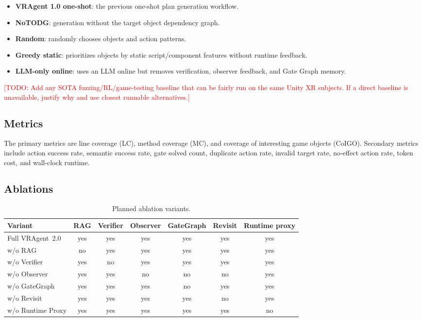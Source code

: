 \documentclass[10pt,conference]{IEEEtran}
\newcommand{\todo}[1]{\textcolor{red}{[TODO: #1]}}
\newcommand{\tool}{VRAgent~2.0}
\begin{document}
\begin{itemize}[leftmargin=*]
  \item \textbf{VRAgent 1.0 one-shot}: the previous one-shot plan generation
  workflow.
  \item \textbf{NoTODG}: generation without the target object dependency graph.
  \item \textbf{Random}: randomly chooses objects and action patterns.
  \item \textbf{Greedy static}: prioritizes objects by static script/component
  features without runtime feedback.
  \item \textbf{LLM-only online}: uses an LLM online but removes verification,
  observer feedback, and Gate Graph memory.
\end{itemize}

\todo{Add any SOTA fuzzing/RL/game-testing baseline that can be fairly run on the
same Unity XR subjects. If a direct baseline is unavailable, justify why and use
closest runnable alternatives.}

\subsection{Metrics}

The primary metrics are line coverage (LC), method coverage (MC), and coverage
of interesting game objects (CoIGO). Secondary metrics include action success
rate, semantic success rate, gate solved count, duplicate action rate, invalid
target rate, no-effect action rate, token cost, and wall-clock runtime.

\subsection{Ablations}

\begin{table}[t]
\centering
\caption{Planned ablation variants.}
\label{tab:ablations}
\begin{tabular}{lcccccc}
\toprule
Variant & RAG & Verifier & Observer & GateGraph & Revisit & Runtime proxy \\
\midrule
Full \tool & yes & yes & yes & yes & yes & yes \\
w/o RAG & no & yes & yes & yes & yes & yes \\
w/o Verifier & yes & no & yes & yes & yes & yes \\
w/o Observer & yes & yes & no & no & no & yes \\
w/o GateGraph & yes & yes & yes & no & yes & yes \\
w/o Revisit & yes & yes & yes & yes & no & yes \\
w/o Runtime Proxy & yes & yes & yes & yes & yes & no \\
\bottomrule
\end{tabular}
\end{table}
\end{document}
